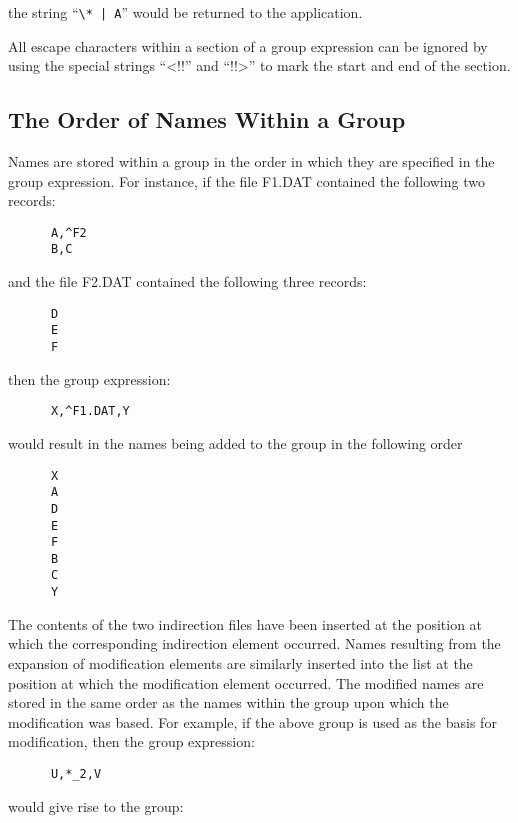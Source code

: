 the string ``\verb+\* | A+'' would be returned to the application.

All escape characters within a section of a group expression can be
ignored by using the special strings ``<!!'' and ``!!>'' to mark the
start and end of the section.

\subsection{The Order of Names Within a Group}
Names are stored within a group in the order in which they are specified in the
group expression. For instance, if the file F1.DAT contained the following two
records:

\small
\begin{verbatim}
      A,^F2
      B,C
\end{verbatim}
\normalsize

and the file F2.DAT contained the following three records:

\small
\begin{verbatim}
      D
      E
      F
\end{verbatim}
\normalsize

then the group expression:

\small
\begin{verbatim}
      X,^F1.DAT,Y
\end{verbatim}
\normalsize

would result in the names being added to the group in the following order

\small
\begin{verbatim}
      X
      A
      D
      E
      F
      B
      C
      Y
\end{verbatim}
\normalsize

The contents of the two indirection files have been inserted at the position at
which the corresponding indirection element occurred. Names resulting from the
expansion of modification elements are similarly inserted into the list at the
position at which the modification element occurred. The modified names are
stored in the same order as the names within the group upon which the
modification was based. For example, if the above group is used as the basis for
modification, then the group expression:

\small
\begin{verbatim}
      U,*_2,V
\end{verbatim}
\normalsize

would give rise to the group:

